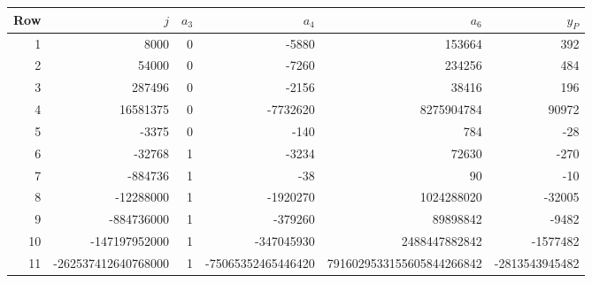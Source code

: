 \begingroup\footnotesize\setlength{\tabcolsep}{4pt}
\begin{longtable}{r r r r r r}
\toprule Row & $j$ & $a_3$ & $a_4$ & $a_6$ & $y_P$\\\midrule\endhead
1 & 8000 & 0 & -5880 & 153664 & 392\\
2 & 54000 & 0 & -7260 & 234256 & 484\\
3 & 287496 & 0 & -2156 & 38416 & 196\\
4 & 16581375 & 0 & -7732620 & 8275904784 & 90972\\
5 & -3375 & 0 & -140 & 784 & -28\\
6 & -32768 & 1 & -3234 & 72630 & -270\\
7 & -884736 & 1 & -38 & 90 & -10\\
8 & -12288000 & 1 & -1920270 & 1024288020 & -32005\\
9 & -884736000 & 1 & -379260 & 89898842 & -9482\\
10 & -147197952000 & 1 & -347045930 & 2488447882842 & -1577482\\
11 & -262537412640768000 & 1 & -75065352465446420 & 7916029533155605844266842 & -2813543945482\\
\bottomrule\end{longtable}
